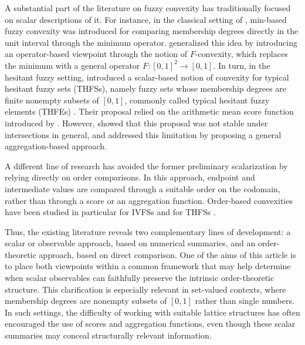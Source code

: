 \documentclass[11pt,a4paper]{article}
\begin{document}
\smallskip

A substantial part of the literature on fuzzy convexity has traditionally focused on scalar descriptions of it. For instance, in the classical setting of \citet{Zadeh1965}, min-based fuzzy convexity was introduced for comparing membership degrees directly in the unit interval through the minimum operator. \citet{Diaz2017} generalized this idea by introducing an operator-based viewpoint through the notion of \(F\)-convexity, which replaces the minimum with a general operator \(F:[0,1]^2\to[0,1]\). In turn, in the hesitant fuzzy setting, \citet{RashidBeg2016} introduced a scalar-based notion of convexity for typical hesitant fuzzy sets (THFSs), namely fuzzy sets whose membership degrees are finite nonempty subsets of \([0,1]\), commonly called typical hesitant fuzzy elements (THFEs) \cite{Bedregal2014}. Their proposal relied on the arithmetic mean score function introduced by \citet{XuXia2011}. However, \citet{JanisMontesRencova2018} showed that this proposal was not stable under intersections in general, and \citet{Huidobro2021} addressed this limitation by proposing a general aggregation-based approach.

\smallskip

A different line of research has avoided the former preliminary scalarization by relying directly on order comparisons. In this approach, endpoint and intermediate values are compared through a suitable order on the codomain, rather than through a score or an aggregation function. Order-based convexities have been studied in particular for IVFSs \citep{Huidobro2022} and for THFSs \citep{Huidobro2025}.

\smallskip



Thus, the existing literature reveals two complementary lines of development: a scalar or observable approach, based on numerical summaries, and an order-theoretic approach, based on direct comparison. One of the aims of this article is to place both viewpoints within a common framework that may help determine when scalar observables can faithfully preserve the intrinsic order-theoretic structure. This clarification is especially relevant in set-valued contexts, where membership degrees are nonempty subsets of \([0,1]\) rather than single numbers. In such settings, the difficulty of working with suitable lattice structures has often encouraged the use of scores and aggregation functions, even though these scalar summaries may conceal structurally relevant information.
\end{document}
